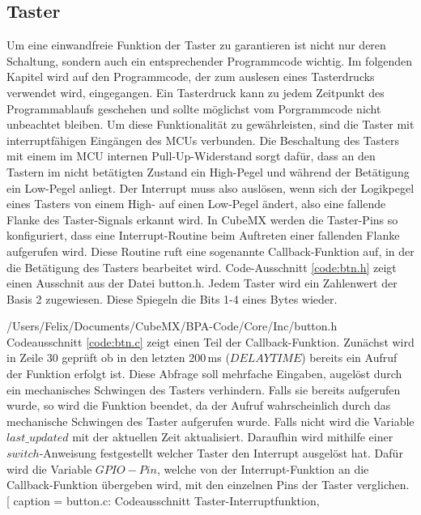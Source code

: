 
\subsection{Taster}
Um eine einwandfreie Funktion der Taster zu garantieren ist nicht nur deren Schaltung, sondern auch ein entsprechender Programmcode wichtig. Im folgenden Kapitel wird auf den Programmcode, der zum auslesen eines Tasterdrucks verwendet wird, eingegangen. Ein Tasterdruck kann zu jedem Zeitpunkt des Programmablaufs geschehen und sollte möglichst vom Porgrammcode nicht unbeachtet bleiben. Um diese Funktionalität zu gewährleisten, sind die Taster mit interruptfähigen Eingängen des MCUs verbunden. Die Beschaltung des Tasters mit einem im MCU internen Pull-Up-Widerstand sorgt dafür, dass an den Tastern im nicht betätigten Zustand ein High-Pegel und während der Betätigung ein Low-Pegel anliegt. Der Interrupt muss also auslösen, wenn sich der Logikpegel eines Tasters von einem High- auf einen Low-Pegel ändert, also eine fallende Flanke des Taster-Signals erkannt wird. In CubeMX werden die Taster-Pins so konfiguriert, dass eine Interrupt-Routine beim Auftreten einer fallenden Flanke aufgerufen wird. Diese Routine ruft eine sogenannte Callback-Funktion auf, in der die Betätigung des Tasters bearbeitet wird. Code-Ausschnitt \ref{code:btn.h} zeigt einen Ausschnit aus der Datei button.h. Jedem Taster wird ein Zahlenwert der Basis 2 zugewiesen. Diese Spiegeln die Bits 1-4 eines Bytes wieder.

{/Users/Felix/Documents/CubeMX/BPA-Code/Core/Inc/button.h} 
Codeausschnitt \ref{code:btn.c} zeigt einen Teil der Callback-Funktion. Zunächst wird in Zeile 30 geprüft ob in den letzten 200\,ms ($DELAYTIME$) bereits ein Aufruf der Funktion erfolgt ist. Diese Abfrage soll mehrfache Eingaben, augelöst durch ein mechanisches Schwingen des Tasters verhindern. Falls sie bereits aufgerufen wurde, so wird die Funktion beendet, da der Aufruf wahrscheinlich durch das mechanische Schwingen des Taster aufgerufen wurde. Falls nicht wird die Variable $last\_updated$ mit der aktuellen Zeit aktualisiert. Daraufhin wird mithilfe einer $switch$-Anweisung festgestellt welcher Taster den Interrupt ausgelöst hat. Dafür wird die Variable $GPIO-Pin$, welche von der Interrupt-Funktion an die Callback-Funktion übergeben wird, mit den einzelnen Pins der Taster verglichen. 
[
caption = button.c: Codeausschnitt Taster-Interruptfunktion,

